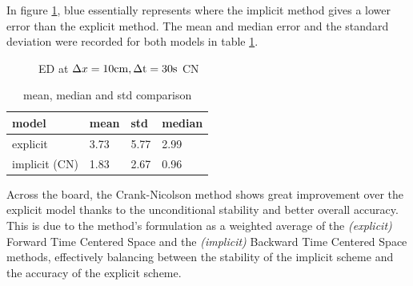 \documentclass[a4paper]{article} %
\begin{document}
\begin{multicols}{2}
In figure \ref{fig:p2_3c}, blue essentially represents where the implicit method gives a lower error than the explicit method. The mean and median error and the standard deviation were recorded for both models in table \ref{table:3}.

\begin{figure}[H]
    
    \caption{ED at $\Delta x = 10\rm{cm}, \Delta t = 30\rm{s}$ CN}
    \label{fig:p2_3c}
\end{figure}

\begin{table}[H]
\centering
\small
\begin{tabular}{ |p{1.8cm}||p{1cm}|p{1cm}|p{1cm}| }
 \hline
 \rowcolor{gray!50} model & mean & std & median \\
 \hline
 \cellcolor{gray!25} explicit & 3.73 & 5.77 & 2.99 \\
 \hline 
 \cellcolor{gray!25} implicit (CN) & 1.83 & 2.67 & 0.96 \\
 \hline
\end{tabular}
\caption{mean, median and std comparison}
\label{table:3}
\end{table}
Across the board, the Crank-Nicolson method shows great improvement over the explicit model thanks to the unconditional stability and better overall accuracy. This is due to the method's formulation as a weighted average of the \textit{(explicit)} Forward Time Centered Space and the \textit{(implicit)} Backward Time Centered Space methods, effectively balancing between the stability of the implicit scheme and the accuracy of the explicit scheme.

\end{multicols}
\end{document}
